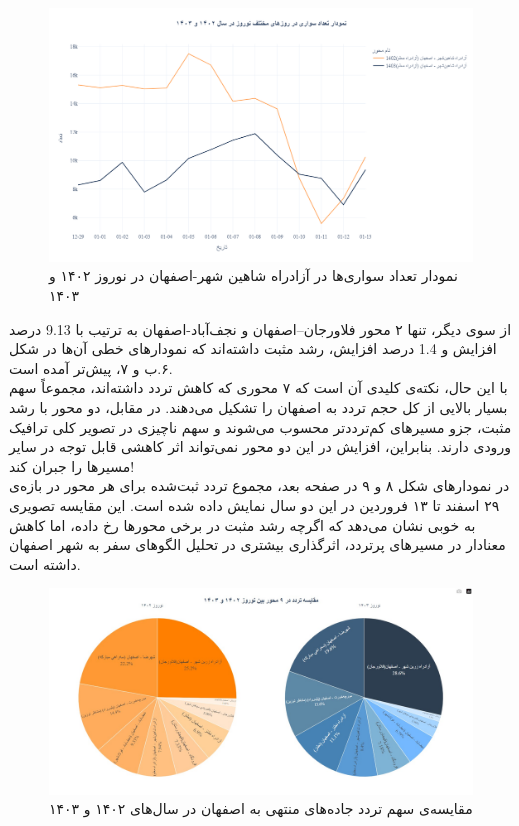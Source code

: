 \documentclass[a4paper, 12pt]{article}
\begin{document}
\newpage
\begin{figure}[htbp]
    \centering
    \includegraphics[width=1\textwidth]{pics/isfahan/compare_215104.png}
    \caption{نمودار تعداد سواری‌ها در آزادراه شاهین شهر-اصفهان در نوروز ۱۴۰۲ و ۱۴۰۳}
\end{figure}

از سوی دیگر، تنها ۲ محور فلاورجان–اصفهان و نجف‌آباد-اصفهان به ترتیب با
9.13
درصد افزایش و 
1.4
درصد افزایش، رشد مثبت داشته‌اند که نمودارهای خطی آن‌ها در شکل ۶.ب و ۷، پیش‌تر آمده است.
\\

با این حال، نکته‌ی کلیدی آن است که ۷ محوری که کاهش تردد داشته‌اند، مجموعاً سهم بسیار بالایی از کل حجم تردد به اصفهان را تشکیل می‌دهند. در مقابل، دو محور با رشد مثبت، جزو مسیرهای کم‌ترددتر محسوب می‌شوند و سهم ناچیزی در تصویر کلی ترافیک ورودی دارند. بنابراین، افزایش در این دو محور نمی‌تواند اثر کاهشی قابل توجه در سایر مسیرها را جبران کند!
\\

در نمودارهای شکل ۸ و ۹ در صفحه بعد، مجموع تردد ثبت‌شده برای هر محور در بازه‌ی ۲۹ اسفند تا ۱۳ فروردین در این دو سال نمایش داده شده است. این مقایسه تصویری به خوبی نشان می‌دهد که اگرچه رشد مثبت در برخی محورها رخ داده، اما کاهش معنادار در مسیرهای پرتردد، اثرگذاری بیشتری در تحلیل الگوهای سفر به شهر اصفهان داشته است.

\begin{figure}[htbp]
    \centering
    \includegraphics[width=1\textwidth]{pics/isfahan/isfahan_pie.jpg}
    \caption{مقایسه‌ی سهم تردد جاده‌های منتهی به اصفهان در سال‌های ۱۴۰۲ و ۱۴۰۳ }
\end{figure}
\end{document}
